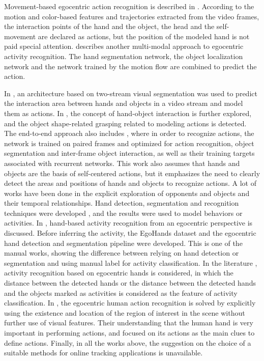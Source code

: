 Movement-based egocentric action recognition is described in \cite{7298625}. According to the motion and color-based features and trajectories extracted from the video frames, the interaction points of the hand and the object, the head and the self-movement are declared as actions, but the position of the modeled hand is not paid special attention. \cite{7780578} describes another multi-modal approach to egocentric activity recognition. The hand segmentation network, the object localization network and the network trained by the motion flow are combined to predict the action.

In \cite{DBLP:journals/corr/BertasiusPYS16}, an architecture based on two-stream visual segmentation was used to predict the interaction area between hands and objects in a video stream and model them as actions. In \cite{cai2016understanding}, the concept of hand-object interaction is further explored, and the object shape-related grasping related to modeling actions is detected. The end-to-end approach also includes \cite{DBLP:journals/corr/abs-1806-06157}, where in order to recognize actions, the network is trained on paired frames and optimized for action recognition, object segmentation and inter-frame object interaction, as well as their training targets associated with recurrent networks. This work also assumes that hands and objects are the basis of self-centered actions, but it emphasizes the need to clearly detect the areas and positions of hands and objects to recognize actions.
A lot of works have been done in the explicit exploration of opponents and objects and their temporal relationships. Hand detection, segmentation and recognition techniques were developed \cite{6619302} \cite{6910041} \cite{10.1016/j.cviu.2016.09.005}, and the results were used to model behaviors or activities. In \cite{7410583}, hand-based activity recognition from an egocentric perspective is discussed. Before inferring the activity, the EgoHands dataset and the egocentric hand detection and segmentation pipeline were developed. This is one of the manual works, showing the difference between relying on hand detection or segmentation and using manual label for activity classification. In the literature \cite{Recognition}, activity recognition based on egocentric hands is considered, in which the distance between the detected hands or the distance between the detected hands and the objects marked as activities is considered as the feature of activity classification.
In \cite{9060114}, the egocentric human action recognition is solved by explicitly using the existence and location of the region of interest in the scene without further use of visual features. Their understanding that the human hand is very important in performing actions, and focused on its actions as the main clues to define actions. Finally, in all the works above, the suggestion on the choice of a suitable methods for online tracking applications is unavailable.
